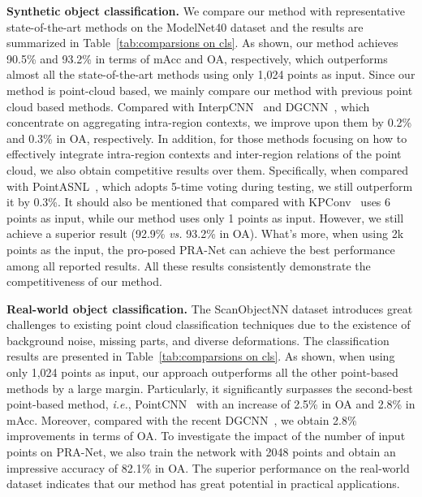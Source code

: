 \documentclass[journal]{IEEEtran}
\def\ie{\emph{i.e.}}
\begin{document}
\noindent\textbf{Synthetic object classification.} We compare our method with representative state-of-the-art methods on the ModelNet40 dataset and the results are summarized in Table~\ref{tab:comparsions on cls}.
As shown, our method achieves 90.5\% and 93.2\% in terms of mAcc and OA, respectively, which outperforms almost all the state-of-the-art methods using only 1,024 points as input. 
Since our method is point-cloud based, we mainly compare our method with previous point cloud based methods. 
Compared with InterpCNN~\cite{mao2019interpolated} and DGCNN~\cite{wang2019dynamic}, which concentrate on aggregating intra-region contexts, we improve upon them by 0.2\% and 0.3\% in OA, respectively. 
In addition, for those methods focusing on how to effectively integrate intra-region contexts and inter-region relations of the point cloud, we also obtain competitive results over them. Specifically, when compared with PointASNL~\cite{yan2020pointasnl}, which adopts 5-time voting during testing, we still outperform it by 0.3\%.  It should also be mentioned that compared with KPConv~\cite{li2018so} uses 6 points as input, while our method uses only 1 points as input. However, we still achieve a superior result (92.9\% \emph{vs.} 93.2\% in OA). What's more, when using 2k points as the input, the pro-posed PRA-Net can achieve the best performance among all reported results. All these results consistently demonstrate the competitiveness of our method. 

\noindent\textbf{Real-world object classification.} The ScanObjectNN dataset introduces great challenges to existing point cloud classification techniques due to the existence of background noise, missing parts, and diverse deformations. The classification results are presented in Table~\ref{tab:comparsions on cls}. As shown, when using only 1,024 points as input, our approach outperforms all the other point-based methods by a large margin. Particularly, it significantly surpasses the second-best point-based method, \ie, PointCNN~\cite{li2018pointcnn} with an increase of 2.5\% in OA and 2.8\% in mAcc. Moreover, compared with the recent DGCNN~\cite{wang2019dynamic}, we obtain 2.8\% improvements in terms of OA. To investigate the impact of the number of input points on PRA-Net, we also train the network with 2048 points and obtain an impressive accuracy of 82.1\% in OA. The superior performance on the real-world dataset indicates that our method has great potential in practical applications.
\end{document}
